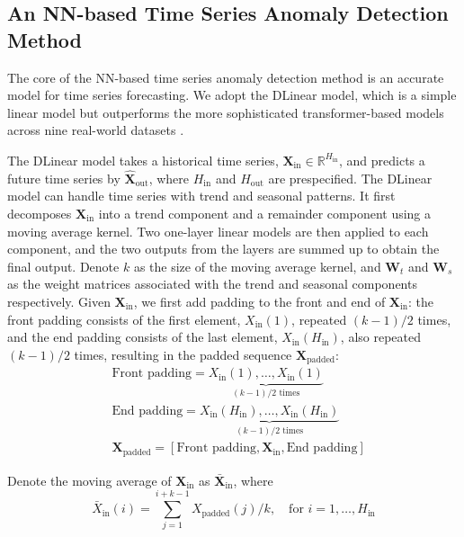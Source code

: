 \documentclass[11pt]{article}
\begin{document}


\subsection{An NN-based Time Series Anomaly Detection Method} 
 The core of the NN-based time series anomaly detection method is an accurate model for time series forecasting. We adopt the DLinear model, which is a simple linear model but outperforms the more sophisticated transformer-based models across nine real-world datasets \citep{zeng2023transformers}.
 
The DLinear model takes a historical time series, $\bm{X}_{\mathrm{in}} \in \mathbb{R}^{H_{\mathrm{in}}}$, and predicts a future time series by $\hat{\bm{X}}_{\mathrm{out}}$, where $H_{\mathrm{in}}$ and $H_{\mathrm{out}}$ are prespecified. The DLinear model can handle time series with trend and seasonal patterns. It first decomposes $\bm{X}_{\mathrm{in}}$ into a trend component and a remainder component using a moving average kernel. Two one-layer linear models are then applied to each component, and the two outputs from the layers are summed up to obtain the final output. Denote $k$ as the size of the moving average kernel, and $\bm{W}_{t}$ and $\bm{W}_{s}$ as the weight matrices associated with the trend and seasonal components respectively. Given $\bm{X}_{\mathrm{in}}$, we first add padding to the front and end of $\bm{X}_{\mathrm{in}}$: the front padding consists of the first element, $X_{\mathrm{in}}(1)$, repeated $(k-1)/2$ times, and the end padding consists of the last element, $X_{\mathrm{in}}(H_{\mathrm{in}})$, also repeated $(k-1)/2$ times, resulting in the padded sequence $\bm{X}_{\mathrm{padded}}$:
\begin{align}
&\text{Front padding} = \underbrace{X_{\mathrm{in}}(1), \ldots, X_{\mathrm{in}}(1)}_{(k-1)/2 \text{ times}}\\
&\text{End padding} = \underbrace{X_{\mathrm{in}}(H_{\mathrm{in}}), \ldots, X_{\mathrm{in}}(H_{\mathrm{in}})}_{(k-1)/2 \text{ times}}\\
&\bm{X}_{\mathrm{padded}} = [\text{Front padding}, \bm{X}_{\mathrm{in}}, \text{End padding}]
\end{align}

Denote the moving average of $\bm{X}_{\mathrm{in}}$ as $\bar{\bm{X}}_{\mathrm{in}}$, where
\begin{equation}
	\bar{X}_{\mathrm{in}}(i) = \sum_{j=1}^{i+k-1}X_{\mathrm{padded}}(j)/k, \quad \text{for } i = 1, \ldots, H_{\mathrm{in}}
\end{equation}
\end{document}
